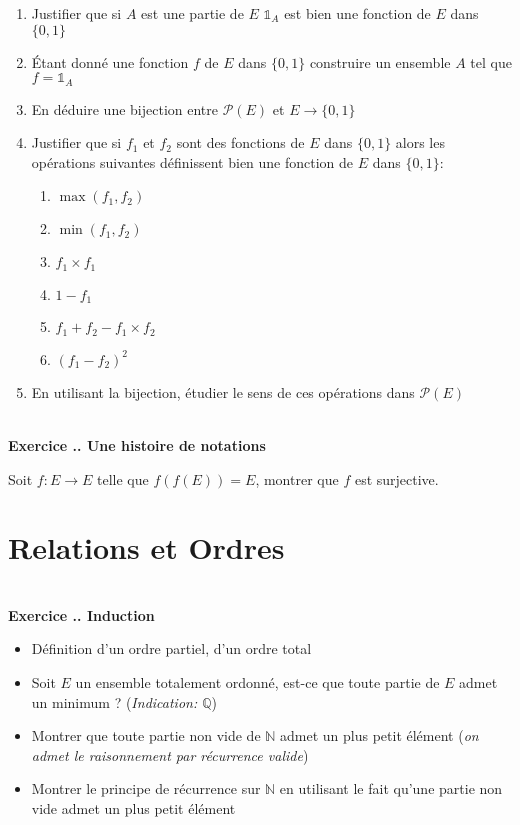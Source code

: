 \documentclass{article}
\newcommand{\mb}[1]{\mathbb{#1}}
\newcounter{exo}
\newcommand{\exercice}[1][\null]{\textbf{\\ \large Exercice \thesection.\theexo. \normalsize #1} \addtocounter{exo}{1}}
\begin{document}
\begin{enumerate}
    \item Justifier que si $A$ est une partie de $E$
        $\mathds{1}_A$ est bien une fonction de $E$ dans $\{ 0, 1 \}$

    \item Étant donné une fonction $f$ de $E$ dans $\{ 0, 1 \}$
        construire un ensemble $A$ tel que $f = \mathds{1}_A$

    \item En déduire une bijection entre $\mathcal{P}(E)$
        et $E \to \{ 0, 1 \}$

    \item Justifier que si $f_1$ et $f_2$ sont des 
        fonctions de $E$ dans $\{0,1\}$ alors 
        les opérations suivantes définissent bien 
        une fonction de $E$ dans $\{ 0, 1\}$:


        \begin{multicols}{2}
            \begin{enumerate}
                \item $\max (f_1, f_2)$
                \item $\min (f_1, f_2)$
                \item $f_1 \times f_1$
                \item $1 - f_1$
                \item $f_1 + f_2 - f_1 \times f_2$
                \item $(f_1 - f_2)^2$
            \end{enumerate}
        \end{multicols}


    \item En utilisant la bijection, étudier 
        le sens de ces opérations dans $\mathcal{P}(E)$
\end{enumerate}

\exercice[Une histoire de notations]

Soit $f : E \to E$ telle que $f(f(E)) = E$,
montrer que $f$ est surjective.

\section{Relations et Ordres}

\exercice[Induction]

\begin{itemize}
    \item Définition d'un ordre partiel, d'un ordre total
    \item Soit $E$ un ensemble totalement ordonné, 
        est-ce que toute partie de $E$ admet un minimum ?
        (\emph{Indication: $\mb{Q}$}) 
    \item Montrer que toute partie non vide de $\mb{N}$ 
        admet un plus petit élément (\emph{on admet 
        le raisonnement par récurrence valide})
    \item Montrer le principe de récurrence sur $\mb{N}$
        en utilisant le fait qu'une partie non vide 
        admet un plus petit élément
\end{itemize}
\end{document}
